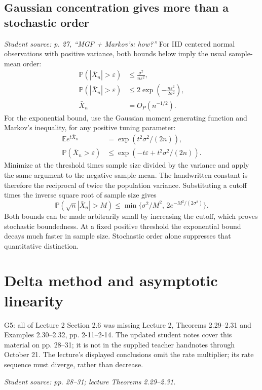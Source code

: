 \documentclass[12pt]{article}
\newcommand{\E}{\mathbb E}
\newcommand{\Prob}{\mathbb P}
\begin{document}
\subsection{Gaussian concentration gives more than a stochastic order}
\textit{Student source: p. 27, ``MGF + Markov's: how?''}
For IID centered normal observations with positive variance, both bounds
below imply the usual sample-mean order:
\begin{align}
 \Prob(|\bar X_n|>\varepsilon)&\le\frac{\sigma^2}{n\varepsilon^2},\\
 \Prob(|\bar X_n|>\varepsilon)&\le
 2\exp\!\left(-\frac{n\varepsilon^2}{2\sigma^2}\right),\\
 \bar X_n&=O_P(n^{-1/2}).
\end{align}
For the exponential bound, use the Gaussian moment generating function
and Markov's inequality, for any positive tuning parameter:
\begin{align}
 \E e^{t\bar X_n}&=\exp(t^2\sigma^2/(2n)),\\
 \Prob(\bar X_n>\varepsilon)&\le
 \exp(-t\varepsilon+t^2\sigma^2/(2n)).
\end{align}
Minimize at the threshold times sample size divided by the variance and
apply the same argument to the negative sample mean. The handwritten
constant is therefore the reciprocal of twice the population variance.
Substituting a cutoff times the inverse square root of sample size gives
\begin{equation}
 \Prob(\sqrt n|\bar X_n|>M)\le
 \min\{\sigma^2/M^2,\,2e^{-M^2/(2\sigma^2)}\}.
\end{equation}
Both bounds can be made arbitrarily small by increasing the cutoff,
which proves stochastic boundedness. At a fixed positive threshold the
exponential bound decays much faster in sample size. Stochastic order
alone suppresses that quantitative distinction.

\section{Delta method and asymptotic linearity}
\begin{gapbox}{G5: all of Lecture 2 Section 2.6 was missing}
Lecture 2, Theorems 2.29--2.31 and Examples 2.30--2.32, pp. 2-11--2-14.
The updated student notes cover this material on pp. 28--31; it is not
in the supplied teacher handnotes through October 21.
The lecture's displayed conclusions omit the rate multiplier; its rate
sequence must diverge, rather than decrease.
\end{gapbox}
\textit{Student source: pp. 28--31; lecture Theorems 2.29--2.31.}
\end{document}
